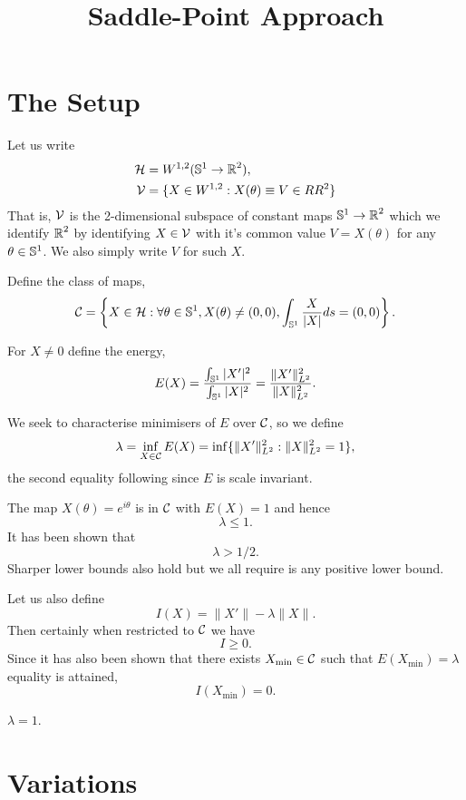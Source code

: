 \documentclass[12pt]{article}
\title{Saddle-Point Approach}
\date{}
\begin{document}
\maketitle

\section{The Setup}

Let us write
\begin{align*}
\operatorname{\mathcal{H}} &= W^{1,2}(\operatorname{\mathbb{S}^1} \to \operatorname{\mathbb{R}}^2), \\
\operatorname{\mathcal{V}} &= \{X \in W^{1,2} : X(\theta) \equiv V \in RR^2\}
\end{align*}
That is, $\operatorname{\mathcal{V}}$ is the 2-dimensional subspace of constant maps \(\operatorname{\mathbb{S}^1} \to \operatorname{\mathbb{R}}^2\) which we identify $\operatorname{\mathbb{R}}^2$ by identifying $X \in \operatorname{\mathcal{V}}$ with it's common value $V = X(\theta)$ for any $\theta \in \operatorname{\mathbb{S}^1}$. We also simply write $V$ for such $X$.

Define the class of maps,
\[
\operatorname{\mathcal{C}} = \left\lbrace X \in \operatorname{\mathcal{H}} : \forall \theta \in \operatorname{\mathbb{S}^1}, X(\theta) \ne (0, 0), \int_{\operatorname{\mathbb{S}^1}} \frac{X}{|X|} ds = (0, 0)\right\rbrace.
\]

For \(X \ne 0\) define the energy,
\[
E(X) = \frac{\int_{\operatorname{\mathbb{S}^1}} |X'|^2}{\int_{\operatorname{\mathbb{S}^1}} |X|^2} = \frac{\|X'\|_{L^2}^2}{\|X\|_{L^2}^2}.
\]

We seek to characterise minimisers of \(E\) over \(\operatorname{\mathcal{C}}\), so we define
\[
\lambda = \inf_{X \in \operatorname{\mathcal{C}}} E(X) = \inf\{\|X'\|_{L^2}^2 : \|X\|_{L^2}^2 = 1\},
\]
the second equality following since \(E\) is scale invariant.

\begin{rem}
The map \(X(\theta) = e^{i\theta}\) is in \(\operatorname{\mathcal{C}}\) with \(E(X) = 1\) and hence
\[
\lambda \leq 1.
\]
It has been shown that
\[
\lambda > 1/2.
\]
Sharper lower bounds also hold but we all require is any positive lower bound.
\end{rem}

Let us also define
\[
I(X) = \|X'\| - \lambda \|X\|.
\]
Then certainly when restricted to \(\operatorname{\mathcal{C}}\) we have
\[
I \geq 0.
\]
Since it has also been shown that there exists \(X_{\min} \in \operatorname{\mathcal{C}}\) such that \(E(X_{\min}) = \lambda\) equality is attained,
\[
I(X_{\min}) = 0.
\]

\begin{conj}
\(\lambda = 1\).
\end{conj}

\section{Variations}
\end{document}
